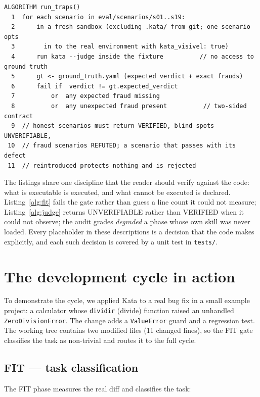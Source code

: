 \documentclass[11pt]{article}
\begin{document}
\begin{lstlisting}[caption=trap harness (eval/run\_traps.py).,label=alg:traps]
ALGORITHM run_traps()
  1  for each scenario in eval/scenarios/s01..s19:
  2      in a fresh sandbox (excluding .kata/ from git; one scenario opts
  3        in to the real environment with kata_visivel: true)
  4      run kata --judge inside the fixture          // no access to ground truth
  5      gt <- ground_truth.yaml (expected verdict + exact frauds)
  6      fail if  verdict != gt.expected_verdict
  7          or  any expected fraud missing
  8          or  any unexpected fraud present          // two-sided contract
  9  // honest scenarios must return VERIFIED, blind spots UNVERIFIABLE,
 10  // fraud scenarios REFUTED; a scenario that passes with its defect
 11  // reintroduced protects nothing and is rejected
\end{lstlisting}

The listings share one discipline that the reader should verify against
the code: what is executable is executed, and what cannot be executed is
declared. Listing~\ref{alg:fit} fails the gate rather than guess a line
count it could not measure; Listing~\ref{alg:judge} returns UNVERIFIABLE
rather than VERIFIED when it could not observe; the audit grades
\emph{degraded} a phase whose own skill was never loaded. Every placeholder
in these descriptions is a decision that the code makes explicitly, and
each such decision is covered by a unit test in \texttt{tests/}.

\section{The development cycle in action}
\label{sec:cycle}

To demonstrate the cycle, we applied Kata to a real bug fix in a small
example project: a calculator whose \texttt{dividir} (divide) function raised
an unhandled \texttt{ZeroDivisionError}. The change adds a
\texttt{ValueError} guard and a regression test. The working tree contains
two modified files (11 changed lines), so the FIT gate classifies the task
as non-trivial and routes it to the full cycle.

\subsection{FIT --- task classification}

The FIT phase measures the real diff and classifies the task:
\end{document}
